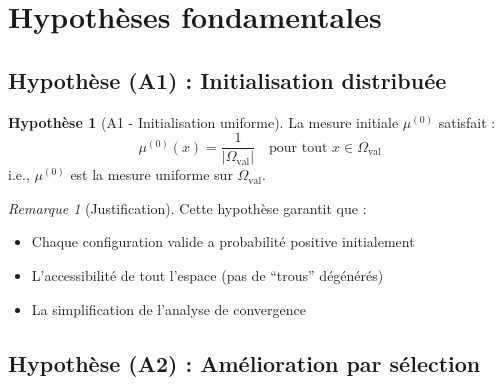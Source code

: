 \documentclass[12pt,a4paper]{article}
\theoremstyle{definition}
\newtheorem{hypothesis}{Hypothèse}
\theoremstyle{remark}
\newtheorem{remark}[theorem]{Remarque}
\begin{document}
	\section{Hypothèses fondamentales}
	
	\subsection{Hypothèse (A1) : Initialisation distribuée}
	
	\begin{hypothesis}[A1 - Initialisation uniforme]\label{hyp:A1}
		La mesure initiale $\mu^{(0)}$ satisfait :
		\begin{equation}
			\mu^{(0)}(x) = \frac{1}{|\Omega_{\text{val}}|} \quad \text{pour tout } x \in \Omega_{\text{val}}
		\end{equation}
		i.e., $\mu^{(0)}$ est la mesure uniforme sur $\Omega_{\text{val}}$.
	\end{hypothesis}
	
	\begin{remark}[Justification]
		Cette hypothèse garantit que :
		\begin{itemize}
			\item Chaque configuration valide a probabilité positive initialement
			\item L'accessibilité de tout l'espace (pas de ``trous'' dégénérés)
			\item La simplification de l'analyse de convergence
		\end{itemize}
	\end{remark}
	
	\subsection{Hypothèse (A2) : Amélioration par sélection}
	
\end{document}

